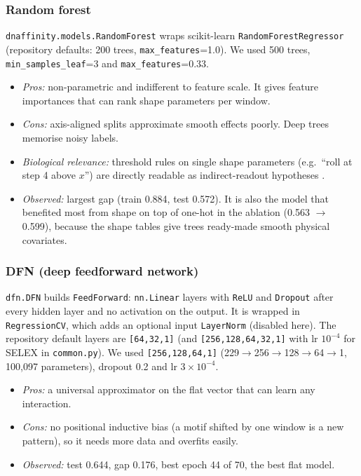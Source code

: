 \subsubsection{Random forest}
\texttt{dnaffinity.models.RandomForest} wraps scikit-learn \texttt{RandomForestRegressor} (repository defaults: 200 trees, \texttt{max\_features}=1.0). We used 500 trees, \texttt{min\_samples\_leaf}=3 and \texttt{max\_features}=0.33.
\begin{itemize}
\item \emph{Pros:} non-parametric and indifferent to feature scale. It gives feature importances that can rank shape parameters per window.
\item \emph{Cons:} axis-aligned splits approximate smooth effects poorly. Deep trees memorise noisy labels.
\item \emph{Biological relevance:} threshold rules on single shape parameters (e.g.\ ``roll at step 4 above $x$'') are directly readable as indirect-readout hypotheses \cite{rohs2009}.
\item \emph{Observed:} largest gap (train 0.884, test 0.572). It is also the model that benefited most from shape on top of one-hot in the ablation (0.563 $\to$ 0.599), because the shape tables give trees ready-made smooth physical covariates.
\end{itemize}

\subsubsection{DFN (deep feedforward network)}
\texttt{dfn.DFN} builds \texttt{FeedForward}: \texttt{nn.Linear} layers with \texttt{ReLU} and \texttt{Dropout} after every hidden layer and no activation on the output. It is wrapped in \texttt{RegressionCV}, which adds an optional input \texttt{LayerNorm} (disabled here). The repository default layers are \texttt{[64,32,1]} (and \texttt{[256,128,64,32,1]} with lr $10^{-4}$ for SELEX in \texttt{common.py}). We used \texttt{[256,128,64,1]} (229$\to$256$\to$128$\to$64$\to$1, 100{,}097 parameters), dropout 0.2 and lr $3\times10^{-4}$.
\begin{itemize}
\item \emph{Pros:} a universal approximator on the flat vector that can learn any interaction.
\item \emph{Cons:} no positional inductive bias (a motif shifted by one window is a new pattern), so it needs more data and overfits easily.
\item \emph{Observed:} test 0.644, gap 0.176, best epoch 44 of 70, the best flat model.
\end{itemize}

